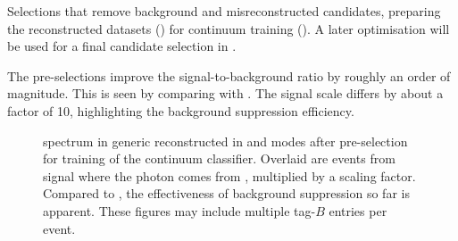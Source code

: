 \begin{table}[htbp!]
    \centering
    \caption{\label{tab:preselections} Selections that remove background and misreconstructed candidates,
    preparing the reconstructed datasets () for continuum \BDT training ().
    A later optimisation will be used for a final candidate selection in .
    }
    
\end{table}

The pre-selections improve the signal-to-background ratio by roughly an order of magnitude.
This is seen by comparing  with .
The \BtoXsgamma signal \MC scale differs by about a factor of 10, highlighting the background suppression efficiency.

\begin{figure}[htbp!]
    \centering
    \caption{\label{fig:preselected_photons} \BtoXsgamma spectrum in generic \MC reconstructed in \feiBp and \feiBz modes
    after pre-selection for training of the continuum \BDT classifier.
    Overlaid are events from signal \MC where the photon comes from \BtoXsgamma, multiplied by a scaling factor.
    Compared to , the effectiveness of background suppression so far is apparent.
    These figures may include multiple tag-$B$ entries per event.
    }
\end{figure}

